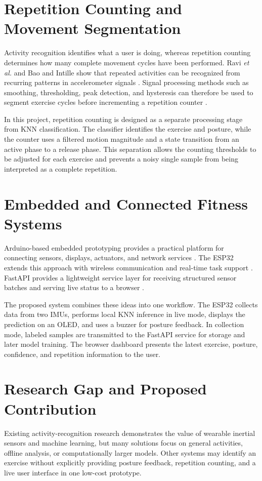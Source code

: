 \section{Repetition Counting and Movement Segmentation}
Activity recognition identifies what a user is doing, whereas repetition counting
determines how many complete movement cycles have been performed. Ravi \textit{et al.}
and Bao and Intille show that repeated activities can be recognized from recurring
patterns in accelerometer signals \cite{ravi2005activity,bao2004activity}. Signal
processing methods such as smoothing, thresholding, peak detection, and hysteresis
can therefore be used to segment exercise cycles before incrementing a repetition
counter \cite{oppenheim2010discrete}.

In this project, repetition counting is designed as a separate processing stage from
KNN classification. The classifier identifies the exercise and posture, while the
counter uses a filtered motion magnitude and a state transition from an active phase
to a release phase. This separation allows the counting thresholds to be adjusted
for each exercise and prevents a noisy single sample from being interpreted as a
complete repetition.

\section{Embedded and Connected Fitness Systems}
Arduino-based embedded prototyping provides a practical platform for connecting
sensors, displays, actuators, and network services \cite{banzi2022arduino}. The ESP32
extends this approach with wireless communication and real-time task support
\cite{espressif2024esp32}. FastAPI provides a lightweight service layer for receiving
structured sensor batches and serving live status to a browser
\cite{fastapi2024docs}.

The proposed system combines these ideas into one workflow. The ESP32 collects data
from two IMUs, performs local KNN inference in live mode, displays the prediction on
an OLED, and uses a buzzer for posture feedback. In collection mode, labeled samples
are transmitted to the FastAPI service for storage and later model training. The
browser dashboard presents the latest exercise, posture, confidence, and repetition
information to the user.

\section{Research Gap and Proposed Contribution}
Existing activity-recognition research demonstrates the value of wearable inertial
sensors and machine learning, but many solutions focus on general activities,
offline analysis, or computationally larger models. Other systems may identify an
exercise without explicitly providing posture feedback, repetition counting, and a
live user interface in one low-cost prototype.

